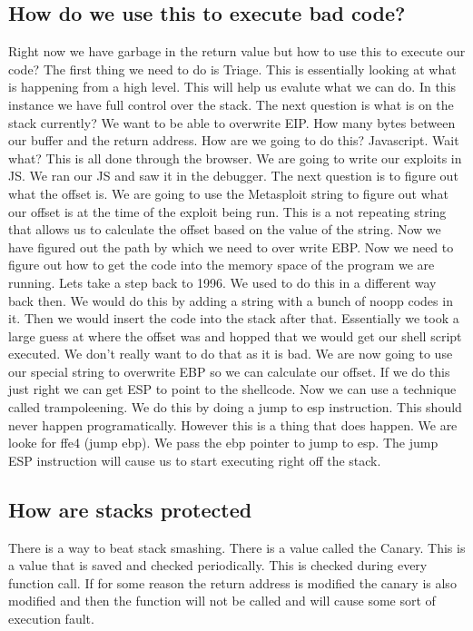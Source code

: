 \documentclass[letterpaper, onecolumn,10pt]{IEEEtran}
\begin{document}
		   \subsection{How do we use this to execute bad code?}
		   Right now we have garbage in the return value but how to use this to execute our code? The first thing we need to do is Triage. This is essentially looking at what is happening from a high level. This will help us evalute what we can do. In this instance we have full control over the stack. The next question is what is on the stack currently? We want to be able to overwrite EIP. How many bytes between our buffer and the return address. How are we going to do this? Javascript. Wait what? This is all done through the browser. We are going to write our exploits in JS. We ran our JS and saw it in the debugger. The next question is to figure out what the offset is. We are going to use the Metasploit string to figure out what our offset is at the time of the exploit being run. This is a not repeating string that allows us to calculate the offset based on the value of the string. Now we have figured out the path by which we need to over write EBP. Now we need to figure out how to get the code into the memory space of the program we are running. Lets take a step back to 1996. We used to do this in a different way back then. We would do this by adding a string with a bunch of noopp codes in it. Then we would insert the code into the stack after that. Essentially we took a large guess at where the offset was and hopped that we would get our shell script executed. We don't really want to do that as it is bad. We are now going to use our special string to overwrite EBP so we can calculate our offset. If we do this just right we can get ESP to point to the shellcode. Now we can use a technique called trampoleening. We do this by doing a jump to esp instruction. This should never happen programatically. However this is a thing that does happen. We are looke for ffe4 (jump ebp). We pass the ebp pointer to jump to esp. The jump ESP instruction will cause us to start executing right off the stack.\\
		   
		   \subsection{How are stacks protected}
		   There is a way to beat stack smashing. There is a value called the Canary. This is a value that is saved and checked periodically. This is checked during every function call. If for some reason the return address is modified the canary is also modified and then the function will not be called and will cause some sort of execution fault.\\
		   
\end{document}
